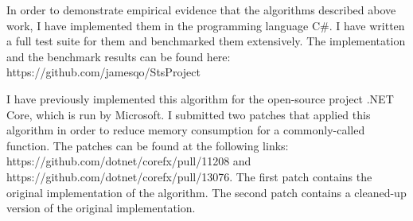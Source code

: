 In order to demonstrate empirical evidence that the algorithms described above work, I have implemented them in the programming language C\#. I have written a full test suite for them and benchmarked them extensively. The implementation and the benchmark results can be found here: https://github.com/jamesqo/StsProject

I have previously implemented this algorithm for the open-source project .NET Core, which is run by Microsoft. I submitted two patches that applied this algorithm in order to reduce memory consumption for a commonly-called function. The patches can be found at the following links: https://github.com/dotnet/corefx/pull/11208 and https://github.com/dotnet/corefx/pull/13076. The first patch contains the original implementation of the algorithm. The second patch contains a cleaned-up version of the original implementation.